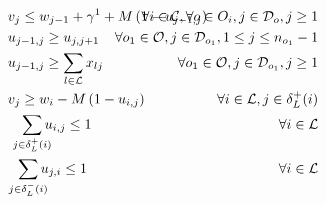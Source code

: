 \documentclass{article}
\begin{document}
\begin{alignat}{3}
    \label{mod:c17}        & v_{j}  \leq  w_{j-1} + \gamma^1 + M\left(1- u_{j-1,j}\right)                                                                                                                                                                                                                           & \hspace{-20mm} \forall i \in \mathcal{C}, \forall o \in O_i, j \in \mathcal{D}_{o}, j \geq 1     \\
    \label{mod:c18}        & u_{j-1,j} \geq u_{j,j+1}                                                                                                                                                                                                                                                               & \hspace{-35mm} \forall o_1 \in\mathcal{O},  j \in \mathcal{D}_{o_1}, 1 \leq j \leq n_{o_{1}}-1   \\
    \label{mod:c19}        & u_{j-1,j} \geq \sum_{l \in \mathcal{L}}{x_{lj}}                                                                                                                                                                                                                                        & \hspace{-20mm}  \forall o_1 \in \mathcal{O}, j \in \mathcal{D}_{o_1}, j \geq 1                   \\
    \label{mod:c20}        & v_{j} \geq w_{i} - M\left(1- u_{i,j}\right)                                                                                                                                                                                                                                            & \hspace{-20mm}  \forall i \in \mathcal{L}, j \in \delta^{+}_{L}(i)                               \\
    \label{mod:c21}        & \hspace{3mm} \smashoperator{ \sum_{ j \in \delta^{+}_{L}(i)}}{u_{i,j } } \leq 1                                                                                                                                                                                                        & \hspace{-20mm}  \forall i \in \mathcal{L}                                                        \\
    \label{mod:c22}        & \hspace{2mm} \smashoperator{ \sum_{ j \in \delta^{-}_{L}(i)}}{u_{j,i } } \leq 1                                                                                                                                                                                                        & \hspace{-20mm} \forall i \in \mathcal{L}                                                         \\

\end{alignat}
\end{document}
